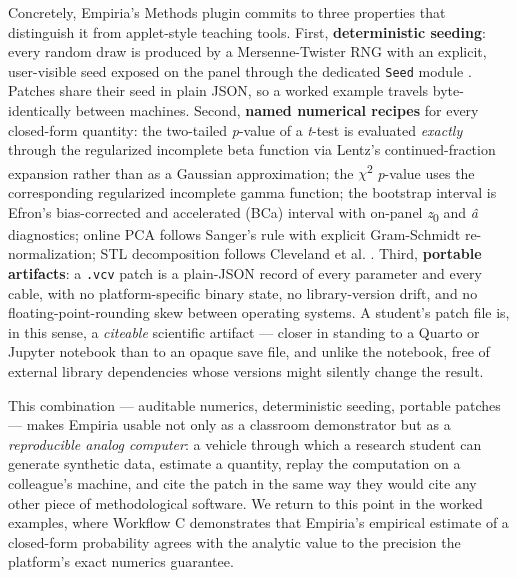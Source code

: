 Concretely, Empiria's Methods plugin commits to three properties that
distinguish it from applet-style teaching tools. First,
\textbf{deterministic seeding}: every random draw is produced by a
Mersenne-Twister RNG with an explicit, user-visible seed exposed on the
panel through the dedicated \texttt{Seed} module \citep{matsumoto1998}.
Patches share their seed in plain JSON, so a worked example travels
byte-identically between machines. Second, \textbf{named numerical
recipes} for every closed-form quantity: the two-tailed \emph{p}-value
of a \emph{t}-test is evaluated \emph{exactly} through the regularized
incomplete beta function via Lentz's continued-fraction expansion
\citep{press2007} rather than as a Gaussian approximation; the \ensuremath{\chi}\textsuperscript{2}
\emph{p}-value uses the corresponding regularized incomplete gamma
function; the bootstrap interval is Efron's bias-corrected and
accelerated (BCa) interval \citep{efron1987} with on-panel \emph{z}\textsubscript{0} and
\emph{\^a} diagnostics; online PCA follows Sanger's rule
\citep{sanger1989} with explicit Gram-Schmidt re-normalization; STL
decomposition follows Cleveland et al. \citep{cleveland1990}. Third,
\textbf{portable artifacts}: a \texttt{.vcv} patch is a plain-JSON
record of every parameter and every cable, with no platform-specific
binary state, no library-version drift, and no floating-point-rounding
skew between operating systems. A student's patch file is, in this
sense, a \emph{citeable} scientific artifact --- closer in standing to a
Quarto or Jupyter notebook than to an opaque save file, and unlike the
notebook, free of external library dependencies whose versions might
silently change the result.

This combination --- auditable numerics, deterministic seeding, portable
patches --- makes Empiria usable not only as a classroom demonstrator
but as a \emph{reproducible analog computer}: a vehicle through which a
research student can generate synthetic data, estimate a quantity,
replay the computation on a colleague's machine, and cite the patch in
the same way they would cite any other piece of methodological software.
We return to this point in the worked examples, where Workflow C
demonstrates that Empiria's empirical estimate of a closed-form
probability agrees with the analytic value to the precision the
platform's exact numerics guarantee.

